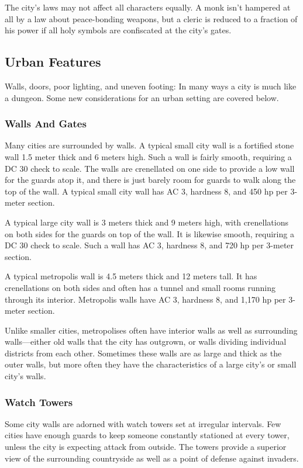 The city's laws may not affect all characters equally. A monk isn't hampered at all by a law about peace-bonding weapons, but a cleric is reduced to a fraction of his power if all holy symbols are confiscated at the city's gates.

\subsection{Urban Features}
Walls, doors, poor lighting, and uneven footing: In many ways a city is much like a dungeon. Some new considerations for an urban setting are covered below.

\subsubsection{Walls And Gates}
Many cities are surrounded by walls. A typical small city wall is a fortified stone wall 1.5 meter thick and 6 meters high. Such a wall is fairly smooth, requiring a DC 30  check to scale. The walls are crenellated on one side to provide a low wall for the guards atop it, and there is just barely room for guards to walk along the top of the wall. A typical small city wall has AC 3, hardness 8, and 450 hp per 3-meter section.

A typical large city wall is 3 meters thick and 9 meters high, with crenellations on both sides for the guards on top of the wall. It is likewise smooth, requiring a DC 30  check to scale. Such a wall has AC 3, hardness 8, and 720 hp per 3-meter section.

A typical metropolis wall is 4.5 meters thick and 12 meters tall. It has crenellations on both sides and often has a tunnel and small rooms running through its interior. Metropolis walls have AC 3, hardness 8, and 1,170 hp per 3-meter section.

Unlike smaller cities, metropolises often have interior walls as well as surrounding walls---either old walls that the city has outgrown, or walls dividing individual districts from each other. Sometimes these walls are as large and thick as the outer walls, but more often they have the characteristics of a large city's or small city's walls.

\subsubsection{Watch Towers}
Some city walls are adorned with watch towers set at irregular intervals. Few cities have enough guards to keep someone constantly stationed at every tower, unless the city is expecting attack from outside. The towers provide a superior view of the surrounding countryside as well as a point of defense against invaders.

